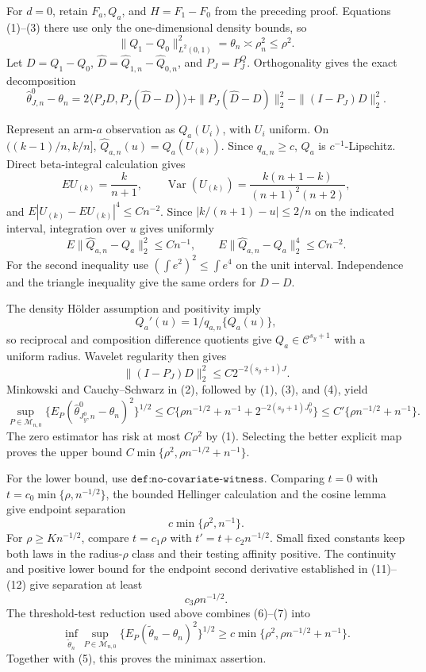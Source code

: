 For \(d=0\), retain \(F_a,Q_a\), and \(H=F_1-F_0\) from the preceding proof. Equations (1)--(3) there use only the one-dimensional density bounds, so
\[
\|Q_1-Q_0\|_{L^2(0,1)}^2=\theta_n\asymp\rho_n^2\le\rho^2. \tag{1}
\]
Let \(D=Q_1-Q_0\), \(\widehat D=\widehat Q_{1,n}-\widehat Q_{0,n}\), and \(P_J=P^Q_J\). Orthogonality gives the exact decomposition
\[
\widehat\theta^0_{J,n}-\theta_n
=2\langle P_JD,P_J(\widehat D-D)\rangle
+\|P_J(\widehat D-D)\|_2^2-\|(I-P_J)D\|_2^2.          \tag{2}
\]

Represent an arm-\(a\) observation as \(Q_a(U_i)\), with \(U_i\) uniform. On \(((k-1)/n,k/n]\), \(\widehat Q_{a,n}(u)=Q_a(U_{(k)})\). Since \(q_{a,n}\ge c\), \(Q_a\) is \(c^{-1}\)-Lipschitz. Direct beta-integral calculation gives
\[
E U_{(k)}=\frac{k}{n+1},\qquad
\operatorname{Var}(U_{(k)})
=\frac{k(n+1-k)}{(n+1)^2(n+2)},
\]
and \(E|U_{(k)}-EU_{(k)}|^4\le Cn^{-2}\). Since \(|k/(n+1)-u|\le2/n\) on the indicated interval, integration over \(u\) gives uniformly
\[
E\|\widehat Q_{a,n}-Q_a\|_2^2\le Cn^{-1},\qquad
E\|\widehat Q_{a,n}-Q_a\|_2^4\le Cn^{-2}.             \tag{3}
\]
For the second inequality use \((\int e^2)^2\le\int e^4\) on the unit interval. Independence and the triangle inequality give the same orders for \(\widehat D-D\).

The density H\"older assumption and positivity imply
\[
Q_a'(u)=1/q_{a,n}\{Q_a(u)\},
\]
so reciprocal and composition difference quotients give \(Q_a\in\mathcal C^{s_y+1}\) with a uniform radius. Wavelet regularity then gives
\[
\|(I-P_J)D\|_2^2\le C2^{-2(s_y+1)J}.                 \tag{4}
\]
Minkowski and Cauchy--Schwarz in (2), followed by (1), (3), and (4), yield
\[
\sup_{P\in\mathcal M_{n,0}}
\{E_P(\widehat\theta^0_{J_y^0,n}-\theta_n)^2\}^{1/2}
\le C\{\rho n^{-1/2}+n^{-1}+2^{-2(s_y+1)J_y^0}\}
\le C'\{\rho n^{-1/2}+n^{-1}\}.                      \tag{5}
\]
The zero estimator has risk at most \(C\rho^2\) by (1). Selecting the better explicit map proves the upper bound \(C\min\{\rho^2,\rho n^{-1/2}+n^{-1}\}\).

For the lower bound, use \(\texttt{def:no-covariate-witness}\). Comparing \(t=0\) with \(t=c_0\min\{\rho,n^{-1/2}\}\), the bounded Hellinger calculation and the cosine lemma give endpoint separation
\[
c\min\{\rho^2,n^{-1}\}.                              \tag{6}
\]
For \(\rho\ge Kn^{-1/2}\), compare \(t=c_1\rho\) with \(t'=t+c_2n^{-1/2}\). Small fixed constants keep both laws in the radius-\(\rho\) class and their testing affinity positive. The continuity and positive lower bound for the endpoint second derivative established in (11)--(12) give separation at least
\[
c_3\rho n^{-1/2}.                                    \tag{7}
\]
The threshold-test reduction used above combines (6)--(7) into
\[
\inf_{\widetilde\theta_n}\sup_{P\in\mathcal M_{n,0}}
\{E_P(\widetilde\theta_n-\theta_n)^2\}^{1/2}
\ge c\min\{\rho^2,\rho n^{-1/2}+n^{-1}\}.             \tag{8}
\]
Together with (5), this proves the minimax assertion.

